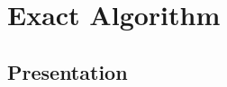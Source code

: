 \documentclass{article}
\begin{document}




    \section{Exact Algorithm}


    \subsection{Presentation}
\end{document}
